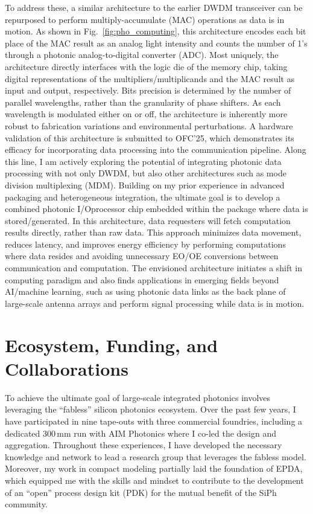 To address these, a similar architecture to the earlier DWDM transceiver can be repurposed to perform multiply-accumulate (MAC) operations as data is in motion. As shown in Fig.~\ref{fig:pho_computing}, this architecture encodes each bit place of the MAC result as an analog light intensity and counts the number of 1's through a photonic analog-to-digital converter (ADC). Most uniquely, the architecture directly interfaces with the logic die of the memory chip, taking digital representations of the multipliers/multiplicands and the MAC result as input and output, respectively. Bits precision is determined by the number of parallel wavelengths, rather than the granularity of phase shifters. As each wavelength is modulated either on or off, the architecture is inherently more robust to fabrication variations and environmental perturbations. A hardware validation of this architecture is submitted to OFC'25, which demonstrates its efficacy for incorporating data processing into the communication pipeline. Along this line, I am actively exploring the potential of integrating photonic data processing with not only DWDM, but also other architectures such as mode division multiplexing (MDM). Building on my prior experience in advanced packaging and heterogeneous integration, the ultimate goal is to develop a combined photonic I/O\textendash{}processor chip embedded within the package where data is stored/generated. In this architecture, data requesters will fetch computation results directly, rather than raw data. This approach minimizes data movement, reduces latency, and improves energy efficiency by performing computations where data resides and avoiding unnecessary EO/OE conversions between communication and computation. The envisioned architecture initiates a shift in computing paradigm and also finds applications in emerging fields beyond AI/machine learning, such as using photonic data links as the back plane of large-scale antenna arrays and perform signal processing while data is in motion.

\section*{Ecosystem, Funding, and Collaborations}

To achieve the ultimate goal of large-scale integrated photonics involves leveraging the ``fabless'' silicon photonics ecosystem. Over the past few years, I have participated in nine tape-outs with three commercial foundries, including a dedicated 300\,mm run with AIM Photonics where I co-led the design and aggregation. Throughout these experiences, I have developed the necessary knowledge and network to lead a research group that leverages the fabless model. Moreover, my \myDegree{} work in compact modeling partially laid the foundation of EPDA, which equipped me with the skills and mindset to contribute to the development of an ``open'' process design kit (PDK) for the mutual benefit of the SiPh community.

